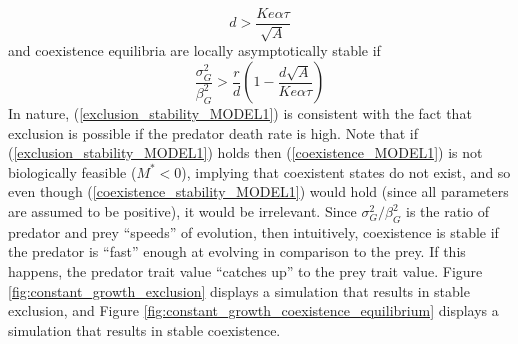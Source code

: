 \documentclass{amsart}
\theoremstyle{definition}
\theoremstyle{remark}
\numberwithin{equation}{section}
\begin{document}
\begin{equation}
	\label{exclusion_stability_MODEL1}
	d > \frac{Ke\alpha\tau}{\sqrt{A}}
\end{equation}
and coexistence equilibria are locally asymptotically stable if
\begin{equation}
	\label{coexistence_stability_MODEL1}
	\frac{\sigma_G^2}{\beta_G^2} > \frac{r}{d}\left(1 - \frac{d\sqrt{A}}{Ke\alpha\tau}\right)
\end{equation}
In nature, (\ref{exclusion_stability_MODEL1}) is consistent with the fact that exclusion is possible if the predator death rate is high.  Note that if (\ref{exclusion_stability_MODEL1}) holds then (\ref{coexistence_MODEL1}) is not biologically feasible ($M^* < 0$), implying that coexistent states do not exist, and so even though (\ref{coexistence_stability_MODEL1}) would hold (since all parameters are assumed to be positive), it would be irrelevant.  Since $\sigma_G^2/\beta_G^2$ is the ratio of predator and prey ``speeds'' of evolution, then intuitively, coexistence is stable if the predator is ``fast'' enough at evolving in comparison to the prey.  If this happens, the predator trait value ``catches up'' to the prey trait value.  Figure \ref{fig:constant_growth_exclusion} displays a simulation that results in stable exclusion, and Figure \ref{fig:constant_growth_coexistence_equilibrium} displays a simulation that results in stable coexistence.
\end{document}
